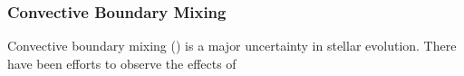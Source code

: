 {\color{purple}
\subsubsection{Convective Boundary Mixing}
}

Convective boundary mixing () is a major uncertainty in stellar evolution. There have been efforts to observe the effects of 

